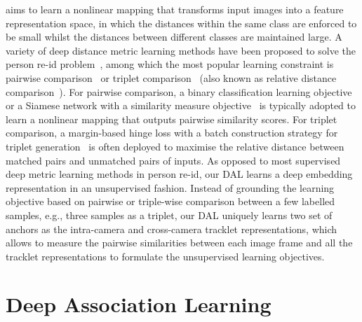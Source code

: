 \documentclass{bmvc2k}
\begin{document}
\vspace{0.1em}
aims to learn a nonlinear mapping that transforms input images into a feature representation space, in which 
the distances within the same class are enforced to be small
whilst the distances between different classes are maintained large. 
A variety of deep distance metric learning methods have been proposed
to solve the person re-id problem~\cite{li2014deepreid,yi2014deep,ahmed2015improved,ding2015deep,liu2016multi,wang2016joint,cheng2016person,chen2016deep,mclaughlin2016recurrent,chen2017beyond,hermans2017defense,xu2017jointly}, 
among which the most popular learning constraint is pairwise comparison~\cite{li2014deepreid,yi2014deep} 
or triplet comparison~\cite{prosserbmvc10,paisitkriangkraicvpr15,hermans2017defense} (also known as relative distance comparison~\cite{zhengpami13,ding2015deep}). 
For pairwise comparison, a binary classification learning objective~\cite{li2014deepreid,ahmed2015improved} or a
Siamese network with a similarity measure
objective~\cite{yi2014deep,mclaughlin2016recurrent,xu2017jointly} is
typically adopted to learn a nonlinear mapping that  
outputs pairwise similarity scores. For triplet comparison, 
a margin-based hinge loss with a batch construction strategy for triplet
generation~\cite{ding2015deep,hermans2017defense} is often deployed to
maximise the relative distance between matched pairs and unmatched
pairs of inputs.
As opposed to most supervised deep metric learning methods in person
re-id, our DAL learns a deep embedding representation in an unsupervised fashion. 
Instead of grounding the learning objective based on pairwise or triple-wise
comparison between a few labelled samples, e.g., three samples as a triplet,
our DAL uniquely learns two set of anchors as the intra-camera and cross-camera tracklet representations, 
which allows to measure the pairwise similarities between each image frame and all
the tracklet representations to formulate the unsupervised learning objectives. 

\vspace{-0.2cm}
\section{Deep Association Learning}
\end{document}
